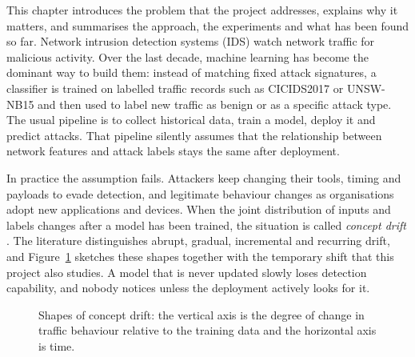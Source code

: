 \documentclass{article}
\begin{document}
This chapter introduces the problem that the project addresses, explains why it matters, and summarises the approach, the experiments and what has been found so far. Network intrusion detection systems (IDS) watch network traffic for malicious activity. Over the last decade, machine learning has become the dominant way to build them: instead of matching fixed attack signatures, a classifier is trained on labelled traffic records such as CICIDS2017 \cite{sharafaldin2018cicids} or UNSW-NB15 \cite{moustafa2015unsw} and then used to label new traffic as benign or as a specific attack type. The usual pipeline is to collect historical data, train a model, deploy it and predict attacks. That pipeline silently assumes that the relationship between network features and attack labels stays the same after deployment.

In practice the assumption fails. Attackers keep changing their tools, timing and payloads to evade detection, and legitimate behaviour changes as organisations adopt new applications and devices. When the joint distribution of inputs and labels changes after a model has been trained, the situation is called \emph{concept drift} \cite{gama2014survey}. The literature distinguishes abrupt, gradual, incremental and recurring drift, and Figure~\ref{fig:drifttypes} sketches these shapes together with the temporary shift that this project also studies. A model that is never updated slowly loses detection capability, and nobody notices unless the deployment actively looks for it.

\begin{figure}[h]
\centering
{}
\caption{Shapes of concept drift: the vertical axis is the degree of change in traffic behaviour relative to the training data and the horizontal axis is time.}
\label{fig:drifttypes}
\end{figure}
\end{document}
